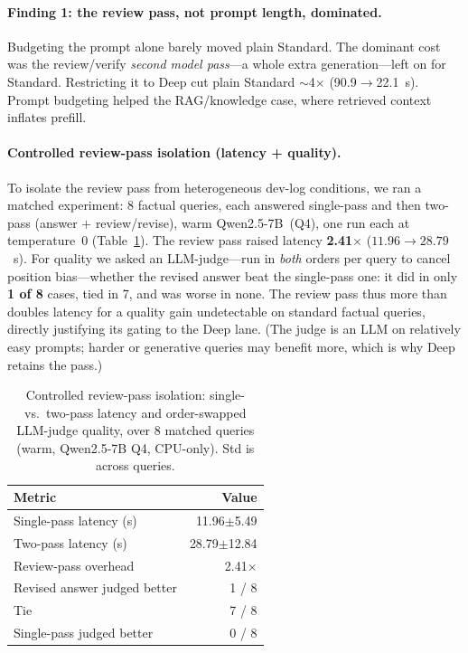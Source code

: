 \documentclass[10pt,twocolumn]{article}
\begin{document}
\paragraph{Finding 1: the review pass, not prompt length, dominated.}
Budgeting the prompt alone barely moved plain Standard. The dominant cost
was the review/verify \emph{second model pass}---a whole extra
generation---left on for Standard. Restricting it to Deep cut plain
Standard $\sim$4$\times$ (90.9$\to$22.1~s). Prompt budgeting helped the
RAG/knowledge case, where retrieved context inflates prefill.

\paragraph{Controlled review-pass isolation (latency + quality).}
To isolate the review pass from heterogeneous dev-log conditions, we ran a
matched experiment: 8 factual queries, each answered single-pass and then
two-pass (answer $+$ review/revise), warm Qwen2.5-7B~(Q4), one run each at
temperature~0 (Table~\ref{tab:reviewpass}). The review pass raised latency
\textbf{2.41$\times$} ($11.96\to28.79$~s). For quality we asked an
LLM-judge---run in \emph{both} orders per query to cancel position
bias---whether the revised answer beat the single-pass one: it did in only
\textbf{1 of 8} cases, tied in 7, and was worse in none. The review pass
thus more than doubles latency for a quality gain undetectable on standard
factual queries, directly justifying its gating to the Deep lane. (The
judge is an LLM on relatively easy prompts; harder or generative queries
may benefit more, which is why Deep retains the pass.)

\begin{table}[t]
  \centering
  \caption{Controlled review-pass isolation: single- vs.\ two-pass latency
  and order-swapped LLM-judge quality, over 8 matched queries (warm,
  Qwen2.5-7B Q4, CPU-only). Std is across queries.}
  \label{tab:reviewpass}
  \small
  \begin{tabular}{lr}
    \toprule
    Metric & Value \\
    \midrule
    Single-pass latency (s)       & 11.96$\pm$5.49 \\
    Two-pass latency (s)          & 28.79$\pm$12.84 \\
    Review-pass overhead          & 2.41$\times$ \\
    \midrule
    Revised answer judged better  & 1 / 8 \\
    Tie                           & 7 / 8 \\
    Single-pass judged better     & 0 / 8 \\
    \bottomrule
  \end{tabular}
\end{table}
\end{document}
